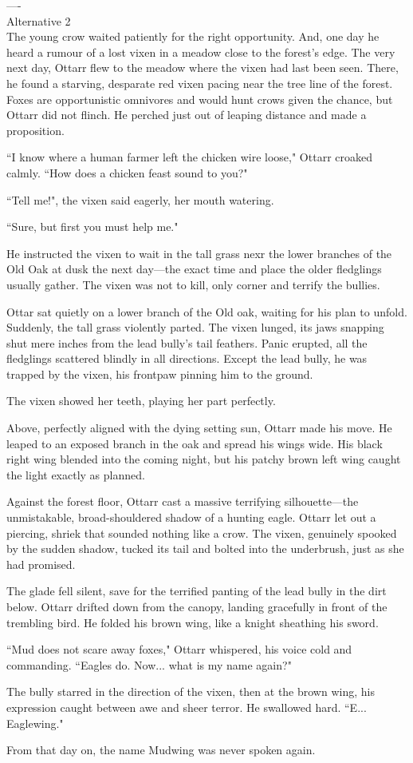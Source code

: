 ----\\
Alternative 2 \\

The young crow waited patiently for the right opportunity. And, one day he heard a rumour of a lost vixen in a meadow close to the forest's edge.
The very next day, Ottarr flew to the meadow where the vixen had last been seen. There, he found a starving, desparate red vixen pacing near the tree line of the forest. Foxes are opportunistic omnivores and would hunt crows given the chance, but Ottarr did not flinch. He perched just out of leaping distance and made a proposition.

``I know where a human farmer left the chicken wire loose," Ottarr croaked calmly. ``How does a chicken feast sound to you?"

``Tell me!", the vixen said eagerly, her mouth watering.

``Sure, but first you must help me."

He instructed the vixen to wait in the tall grass nexr the lower branches of the Old Oak at dusk the next day---the exact time and place the older fledglings usually gather. The vixen was not to kill, only corner and terrify the bullies.

Ottar sat quietly on a lower branch of the Old oak, waiting for his plan to unfold. Suddenly, the tall grass violently parted. The vixen lunged, its jaws snapping shut mere inches from the lead bully's tail feathers. Panic erupted, all the fledglings scattered blindly in all directions. Except the lead bully, he was trapped by the vixen, his frontpaw pinning him to the ground.

The vixen showed her teeth, playing her part perfectly.

Above, perfectly aligned with the dying setting sun, Ottarr made his move. He leaped to an exposed branch in the oak and spread his wings wide. His black right wing blended into the coming night, but his patchy brown left wing caught the light exactly as planned.

Against the forest floor, Ottarr cast a massive terrifying silhouette---the unmistakable, broad-shouldered shadow of a hunting eagle. Ottarr let out a piercing, shriek that sounded nothing like a crow. The vixen, genuinely spooked by the sudden shadow, tucked its tail and bolted into the underbrush, just as she had promised.

The glade fell silent, save for the terrified panting of the lead bully in the dirt below. Ottarr drifted down from the canopy, landing gracefully in front of the trembling bird. He folded his brown wing, like a knight sheathing his sword.

``Mud does not scare away foxes," Ottarr whispered, his voice cold and commanding. ``Eagles do. Now... what is my name again?"

The bully starred in the direction of the vixen, then at the brown wing, his expression caught between awe and sheer terror. He swallowed hard. ``E... Eaglewing."

From that day on, the name Mudwing was never spoken again.
